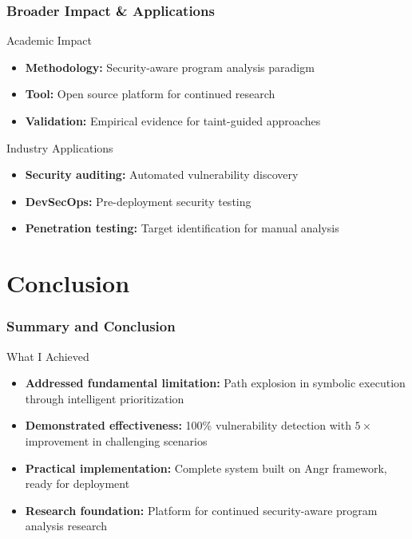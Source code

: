\documentclass[aspectratio=169]{beamer}
\begin{document}
\begin{frame}
    \frametitle{Broader Impact \& Applications}
    \begin{research}{Academic Impact}
        \begin{itemize}
            \item \textbf{Methodology:} Security-aware program analysis paradigm
            \item \textbf{Tool:} Open source platform for continued research
            \item \textbf{Validation:} Empirical evidence for taint-guided approaches
        \end{itemize}
    \end{research}
    
    \vspace{1em}
    \begin{implementation}{Industry Applications}
        \begin{itemize}
            \item \textbf{Security auditing:} Automated vulnerability discovery
            \item \textbf{DevSecOps:} Pre-deployment security testing
            \item \textbf{Penetration testing:} Target identification for manual analysis
        \end{itemize}
    \end{implementation}
\end{frame}

\section{Conclusion}

\begin{frame}
    \frametitle{Summary and Conclusion}
    \begin{evaluation}{What I Achieved}
        \begin{itemize}
            \item \textbf{Addressed fundamental limitation:} Path explosion in symbolic execution through intelligent prioritization
            \item \textbf{Demonstrated effectiveness:} 100\% vulnerability detection with $5 \times$ improvement in challenging scenarios
            \item \textbf{Practical implementation:} Complete system built on Angr framework, ready for deployment
            \item \textbf{Research foundation:} Platform for continued security-aware program analysis research
        \end{itemize}
    \end{evaluation}
\end{frame}
\end{document}
